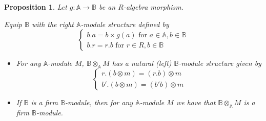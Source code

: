 \documentclass[10pt,a4paper]{amsart}
\newtheorem{prop}{Proposition}
\newcommand{\bA}{\mathbb{A}}
\newcommand{\bB}{\mathbb{B}}
\begin{document}
\begin{prop}
Let $g : \bA \to \bB$ be an $R$-algebra morphism.

Equip $\bB$ with the right $\bA$-module structure defined by
\[
\begin{cases}
b.a = b \times g(a) \text{ for } a\in \bA, b \in \bB 
\\
b.r = r.b\text{ for } r \in R, b \in \bB 
\end{cases}
\]

\begin{itemize}
    \item For any $\bA$-module $M$, $\bB \otimes_\bA M$ has a natural (left) $\bB$-module structure given by
    \[
    \begin{cases}
    r.(b \otimes m) = (r.b) \otimes m \\
    b' .(b \otimes m) = (b'b) \otimes m
    \end{cases}
    \]
    \item If $\bB$ is a firm $\bB$-module, then for any $\bA$-module $M$ we have that $\bB \otimes_\bA M$ is a firm $\bB$-module.
\end{itemize}
\end{prop}
\end{document}
